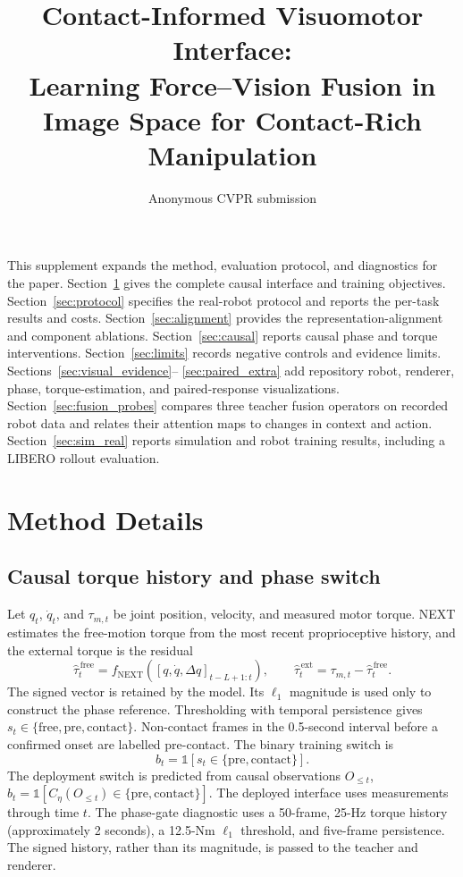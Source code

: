 \documentclass[10pt,twocolumn,letterpaper]{article}
\title{Contact-Informed Visuomotor Interface:\\
Learning Force--Vision Fusion in Image Space for Contact-Rich Manipulation}
\author{Anonymous CVPR submission}
\begin{document}
\maketitlesupplementary

This supplement expands the method, evaluation protocol, and diagnostics for
the paper. Section~\ref{sec:method} gives the complete causal interface and
training objectives. Section~\ref{sec:protocol} specifies the real-robot
protocol and reports the per-task results and costs. Section~\ref{sec:alignment}
provides the representation-alignment and component ablations. Section~\ref{sec:causal}
reports causal phase and torque interventions. Section~\ref{sec:limits} records
negative controls and evidence limits. Sections~\ref{sec:visual_evidence}--
\ref{sec:paired_extra} add repository robot, renderer, phase, torque-estimation,
and paired-response visualizations. Section~\ref{sec:fusion_probes} compares
three teacher fusion operators on recorded robot data and relates their
attention maps to changes in context and action. Section~\ref{sec:sim_real}
reports simulation and robot training results, including a LIBERO rollout evaluation.

\section{Method Details}
\label{sec:method}

\subsection{Causal torque history and phase switch}
\label{sec:method_phase}
Let $q_t$, $\dot q_t$, and $\tau_{m,t}$ be joint position, velocity, and
measured motor torque. NEXT estimates the free-motion torque from the most
recent proprioceptive history, and the external torque is the residual
\begin{equation}
 \widehat{\tau}^{\,\mathrm{free}}_t=f_{\mathrm{NEXT}}([q,\dot q,\Delta q]_{t-L+1:t}),\qquad
 \widehat{\tau}^{\,\mathrm{ext}}_t=\tau_{m,t}-\widehat{\tau}^{\,\mathrm{free}}_t.
 \label{eq:next}
\end{equation}
The signed vector is retained by the model. Its $\ell_1$ magnitude is used
only to construct the phase reference. Thresholding with temporal persistence
gives $s_t\in\{\mathrm{free},\mathrm{pre},\mathrm{contact}\}$. Non-contact
frames in the 0.5-second interval before a confirmed onset are labelled
pre-contact. The binary training switch is
\begin{equation}
 b_t=\mathbb{1}[s_t\in\{\mathrm{pre},\mathrm{contact}\}].
 \label{eq:phase}
\end{equation}
The deployment switch is predicted from causal observations $O_{\leq t}$,
$\widehat b_t=\mathbb{1}[C_\eta(O_{\leq t})\in\{\mathrm{pre},\mathrm{contact}\}]$.
The deployed interface uses measurements through time $t$. The phase-gate
diagnostic uses a 50-frame, 25-Hz torque history
(approximately 2 seconds), a 12.5-Nm $\ell_1$ threshold, and five-frame
persistence. The signed history, rather than its magnitude, is passed to the
teacher and renderer.
\end{document}
